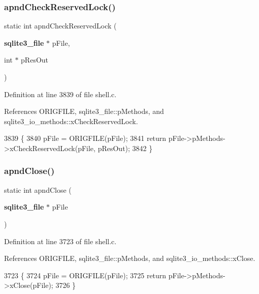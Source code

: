 \subsubsection{apnd\+Check\+Reserved\+Lock()}
{\footnotesize\ttfamily static int apnd\+Check\+Reserved\+Lock (\begin{DoxyParamCaption}\item[{\textbf{ sqlite3\+\_\+file} $\ast$}]{p\+File,  }\item[{int $\ast$}]{p\+Res\+Out }\end{DoxyParamCaption})\hspace{0.3cm}{\ttfamily [static]}}



Definition at line 3839 of file shell.\+c.



References O\+R\+I\+G\+F\+I\+LE, sqlite3\+\_\+file\+::p\+Methods, and sqlite3\+\_\+io\+\_\+methods\+::x\+Check\+Reserved\+Lock.


\begin{DoxyCode}
3839                                                                    \{
3840   pFile = ORIGFILE(pFile);
3841   \textcolor{keywordflow}{return} pFile->pMethods->xCheckReservedLock(pFile, pResOut);
3842 \}
\end{DoxyCode}
\mbox{\label{shell_8c_a9058c304b84213fa127746bab8c07bda}} 
\subsubsection{apnd\+Close()}
{\footnotesize\ttfamily static int apnd\+Close (\begin{DoxyParamCaption}\item[{\textbf{ sqlite3\+\_\+file} $\ast$}]{p\+File }\end{DoxyParamCaption})\hspace{0.3cm}{\ttfamily [static]}}



Definition at line 3723 of file shell.\+c.



References O\+R\+I\+G\+F\+I\+LE, sqlite3\+\_\+file\+::p\+Methods, and sqlite3\+\_\+io\+\_\+methods\+::x\+Close.


\begin{DoxyCode}
3723                                          \{
3724   pFile = ORIGFILE(pFile);
3725   \textcolor{keywordflow}{return} pFile->pMethods->xClose(pFile);
3726 \}
\end{DoxyCode}
\mbox{\label{shell_8c_ac24f3b577630f858e7c148603da6e68d}} 
